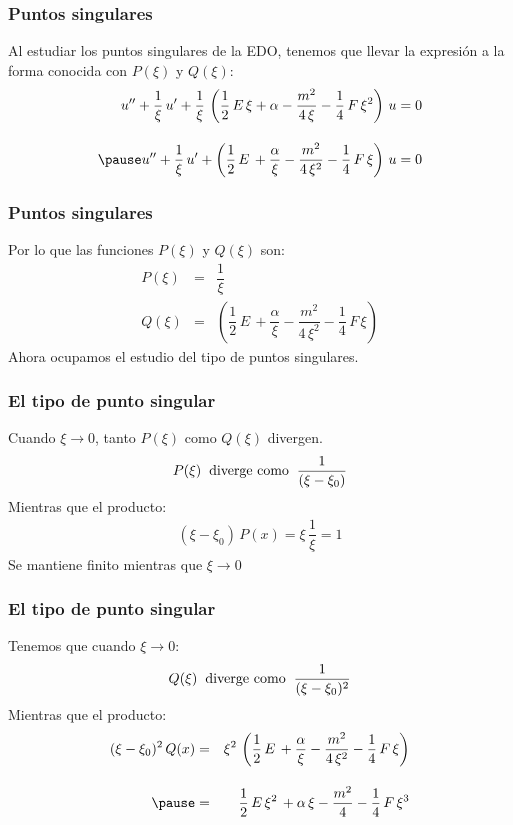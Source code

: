 \documentclass[12pt]{beamer}
\begin{document}
\begin{frame}
\frametitle{Puntos singulares}
Al estudiar los puntos singulares de la EDO, tenemos que llevar la expresión a la forma conocida con $P(\xi)$ y $Q(\xi)$:
\begin{eqnarray*}
\stilde{u} + \dfrac{1}{\xi} \, \ptilde{u} + \dfrac{1}{\xi} \, \left( \dfrac{1}{2} \, E \, \xi + \alpha - \dfrac{m^{2}}{4 \, \xi} - \dfrac{1}{4} \, F \, \xi^{2} \right) \, u = 0 \\[1em] \pause
\stilde{u} + \dfrac{1}{\xi} \, \ptilde{u} + \left( \dfrac{1}{2} \, E \, + \dfrac{\alpha}{\xi} - \dfrac{m^{2}}{4 \, \xi^{2}} - \dfrac{1}{4} \, F \, \xi \right) \, u = 0
\end{eqnarray*}
\end{frame}
\begin{frame}
\frametitle{Puntos singulares}
Por lo que las funciones $P(\xi)$ y $Q(\xi)$ son:
\pause
\begin{eqnarray*}
P(\xi) &=& \dfrac{1}{\xi} \\[1em]
Q(\xi) &=& \left( \dfrac{1}{2} \, E \, + \dfrac{\alpha}{\xi} - \dfrac{m^{2}}{4 \, \xi^{2}} - \dfrac{1}{4} \, F \, \xi \right)
\end{eqnarray*}
\pause
Ahora ocupamos el estudio del tipo de puntos singulares.
\end{frame}
\begin{frame}
\frametitle{El tipo de punto singular}
Cuando $\xi \to 0$, tanto $P(\xi)$ como $Q(\xi)$ divergen.
\pause
\begin{align*}
P(\xi) \hspace{0.2cm} \mbox{diverge como} \hspace{0.2cm} \dfrac{1}{(\xi - \xi_{0})}
\end{align*}
\pause
Mientras que el producto:
\begin{align*}
(\xi - \xi_{0}) \, P(x) = \xi \, \dfrac{1}{\xi} = 1
\end{align*}
\pause
Se mantiene finito mientras que $\xi \to 0$
\end{frame}
\begin{frame}
\frametitle{El tipo de punto singular}
Tenemos que cuando $\xi \to 0$:
\begin{align*}
Q(\xi) \hspace{0.2cm} \mbox{diverge como} \hspace{0.2cm} \dfrac{1}{(\xi - \xi_{0})^{2}}
\end{align*}
\pause
Mientras que el producto:
\begin{eqnarray*}
(\xi - \xi_{0})^{2} \, Q(x) &=& \xi^{2} \, \left( \dfrac{1}{2} \, E \, + \dfrac{\alpha}{\xi} - \dfrac{m^{2}}{4 \, \xi^{2}} - \dfrac{1}{4} \, F \, \xi \right) \\[1em] \pause
&=& \dfrac{1}{2} \, E \, \xi^{2} \, + \alpha \, \xi - \dfrac{m^{2}}{4} - \dfrac{1}{4} \, F \, \xi^{3}
\end{eqnarray*}
\end{frame}
\end{document}
